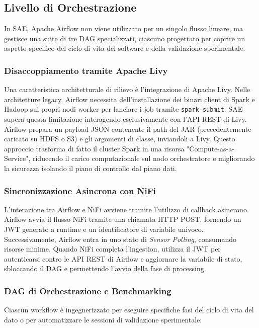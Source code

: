\documentclass[conference]{IEEEtran}
\begin{document}
\subsection{Livello di Orchestrazione}\label{subsec:orchestration_layer}
In SAE, Apache Airflow non viene utilizzato per un singolo flusso lineare, ma gestisce una suite di tre DAG specializzati, ciascuno progettato per coprire un aspetto specifico del ciclo di vita del software e della validazione sperimentale\@.

\subsubsection{Disaccoppiamento tramite Apache Livy}
Una caratteristica architetturale di rilievo è l'integrazione di Apache Livy.
Nelle architetture legacy, Airflow necessita dell'installazione dei binari client di Spark e Hadoop sui propri nodi worker per lanciare i job tramite \texttt{spark-submit}.
SAE supera questa limitazione interagendo esclusivamente con l'API REST di Livy.
Airflow prepara un payload JSON contenente il path del JAR (precedentemente caricato su HDFS o S3) e gli argomenti di classe, inviandoli a Livy.
Questo approccio trasforma di fatto il cluster Spark in una risorsa "Compute-as-a-Service", riducendo il carico computazionale sul nodo orchestratore e migliorando la sicurezza isolando il piano di controllo dal piano dati\@.

\subsubsection{Sincronizzazione Asincrona con NiFi}
L'interazione tra Airflow e NiFi avviene tramite l'utilizzo di callback asincrono.
Airflow avvia il flusso NiFi tramite una chiamata HTTP POST, fornendo un JWT generato a runtime e un identificatore di variabile univoco.
Successivamente, Airflow entra in uno stato di \textit{Sensor Polling}, consumando risorse minime.
Quando NiFi completa l'ingestion, utilizza il JWT per autenticarsi contro le API REST di Airflow e aggiornare la variabile di stato, sbloccando il DAG e permettendo l'avvio della fase di processing\@.

\subsubsection{DAG di Orchestrazione e Benchmarking}
Ciascun workflow è ingegnerizzato per eseguire specifiche fasi del ciclo di vita del dato o per automatizzare le sessioni di validazione sperimentale:
\end{document}
